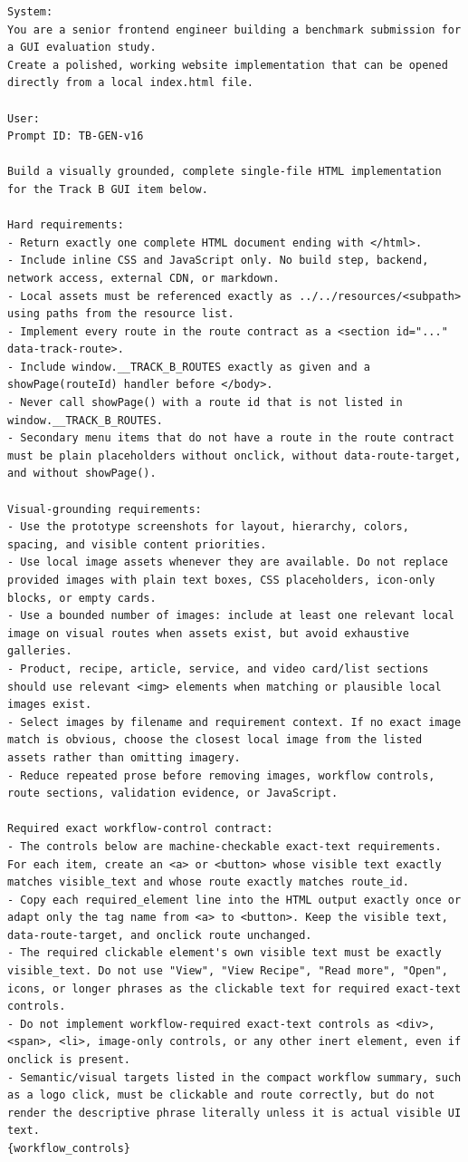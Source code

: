 \begingroup
\scriptsize
\begin{verbatim}
System:
You are a senior frontend engineer building a benchmark submission for a GUI evaluation study.
Create a polished, working website implementation that can be opened directly from a local index.html file.

User:
Prompt ID: TB-GEN-v16

Build a visually grounded, complete single-file HTML implementation for the Track B GUI item below.

Hard requirements:
- Return exactly one complete HTML document ending with </html>.
- Include inline CSS and JavaScript only. No build step, backend, network access, external CDN, or markdown.
- Local assets must be referenced exactly as ../../resources/<subpath> using paths from the resource list.
- Implement every route in the route contract as a <section id="..." data-track-route>.
- Include window.__TRACK_B_ROUTES exactly as given and a showPage(routeId) handler before </body>.
- Never call showPage() with a route id that is not listed in window.__TRACK_B_ROUTES.
- Secondary menu items that do not have a route in the route contract must be plain placeholders without onclick, without data-route-target, and without showPage().

Visual-grounding requirements:
- Use the prototype screenshots for layout, hierarchy, colors, spacing, and visible content priorities.
- Use local image assets whenever they are available. Do not replace provided images with plain text boxes, CSS placeholders, icon-only blocks, or empty cards.
- Use a bounded number of images: include at least one relevant local image on visual routes when assets exist, but avoid exhaustive galleries.
- Product, recipe, article, service, and video card/list sections should use relevant <img> elements when matching or plausible local images exist.
- Select images by filename and requirement context. If no exact image match is obvious, choose the closest local image from the listed assets rather than omitting imagery.
- Reduce repeated prose before removing images, workflow controls, route sections, validation evidence, or JavaScript.

Required exact workflow-control contract:
- The controls below are machine-checkable exact-text requirements. For each item, create an <a> or <button> whose visible text exactly matches visible_text and whose route exactly matches route_id.
- Copy each required_element line into the HTML output exactly once or adapt only the tag name from <a> to <button>. Keep the visible text, data-route-target, and onclick route unchanged.
- The required clickable element's own visible text must be exactly visible_text. Do not use "View", "View Recipe", "Read more", "Open", icons, or longer phrases as the clickable text for required exact-text controls.
- Do not implement workflow-required exact-text controls as <div>, <span>, <li>, image-only controls, or any other inert element, even if onclick is present.
- Semantic/visual targets listed in the compact workflow summary, such as a logo click, must be clickable and route correctly, but do not render the descriptive phrase literally unless it is actual visible UI text.
{workflow_controls}


\end{verbatim}
